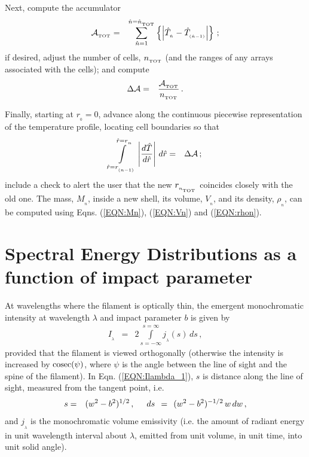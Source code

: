 \documentclass[usenatbib]{mn2e}
\numberwithin{equation}{section}
\begin{document}
Next, compute the accumulator
\begin{eqnarray}
{\cal A}_{_{\rm TOT}}&=&\sum\limits_{{\hat n}=1}^{{\hat n}={\hat n}_{_{\rm TOT}}}\left\{\left|{\hat T}_{_{\hat n}}-{\hat T}_{_{({\hat n}-1)}}\right|\right\}\,;
\end{eqnarray}
if desired, adjust the number of cells, $n_{_{\rm TOT}}$ (and the ranges of any arrays associated with the cells); and compute
\begin{eqnarray}
\Delta{\cal A}&=&\frac{{\cal A}_{_{\rm TOT}}}{n_{_{\rm TOT}}}\,.
\end{eqnarray}

Finally, starting at $r_{_0}=0$, advance along the continuous piecewise representation of the temperature profile, locating cell boundaries so that
\begin{eqnarray}
\int\limits_{{\hat r}=r_{_{(n-1)}}}^{{\hat r}=r_{_n}}\left|\frac{d{\hat T}}{d{\hat r}}\right|\,d{\hat r}&=&\Delta{\cal A}\,;
\end{eqnarray}
include a check to alert the user that the new $r_{_{n_{_{\rm TOT}}}}$ coincides closely with the old one. The mass, $M_{_n}$, inside a new shell, its volume, $V_{_n}$, and its density, $\rho_{_n}$, can be computed using Eqns. (\ref{EQN:Mn}), (\ref{EQN:Vn}) and (\ref{EQN:rhon}).






\section{Spectral Energy Distributions as a function of impact parameter}

At wavelengths where the filament is optically thin, the emergent monochromatic intensity at wavelength $\lambda$ and impact parameter $b$ is given by
\begin{eqnarray}\label{EQN:Ilambda_1}
I_{_\lambda}&=&2\int\limits_{s=-\infty}^{s=\infty}j_{_\lambda}(s)\,ds\,,
\end{eqnarray}
provided that the filament is viewed orthogonally (otherwise the intensity is increased by ${\rm cosec}(\psi)$, where $\psi$ is the angle between the line of sight and the spine of the filament). In Eqn. (\ref{EQN:Ilambda_1}), $s$ is distance along the line of sight, measured from the tangent point, i.e.
\begin{eqnarray}
s&=&(w^2-b^2)^{1/2}\,,\hspace{0.5cm}ds\;\,=\;\,(w^2-b^2)^{-1/2}\,w\,dw\,,
\end{eqnarray}
and $j_{_\lambda}$ is the monochromatic volume emissivity (i.e. the amount of radiant energy in unit wavelength interval about $\lambda$, emitted from unit volume, in unit time, into unit solid angle).
\end{document}
